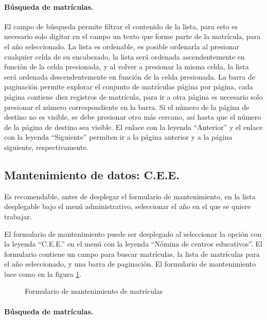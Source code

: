 \documentclass[a4paper, 9pt, conference]{article}              %
\begin{document}
\paragraph{B\'usqueda de matr\'iculas.}

El campo de b\'usqueda permite filtrar el contenido de la lista, para esto es necesario solo digitar en el campo un texto que forme parte de la matr\'icula, para el a\~no seleccionado. La lista es ordenable, es posible ordenarla al presionar cualquier celda de su encabezado, la lista ser\'a ordenada ascendentemente en funci\'on de la celda presionada, y al volver a presionar la misma celda, la lista ser\'a ordenada descendentemente en funci\'on de la celda presionada. La barra de paginaci\'on permite explorar el conjunto de matr\'iculas p\'agina por p\'agina, cada p\'agina contiene diez registros de matr\'icula, para ir a otra p\'agina es necesario solo presionar el n\'umero correspondiente en la barra. Si el n\'umero de la p\'agina de destino no es visible, se debe presionar otro m\'as cercano, as\'i hasta que el n\'umero de la p\'agina de destino sea visible. El enlace con la leyenda ``Anterior'' y el enlace con la leyenda ``Siguiente'' permiten ir a la p\'agina anterior y a la p\'agina siguiente, respectivamente.


\subsection{Mantenimiento de datos: C.E.E.}
Es recomendable, antes de desplegar el formulario de mantenimiento, en la lista desplegable bajo el men\'u administrativo, seleccionar el a\~no en el que se quiere trabajar.

El formulario de mantenimiento puede ser desplegado al seleccionar la opci\'on con la leyenda ``C.E.E.'' en el men\'u con la leyenda ``N\'omina de centros educativos''. El formulario contiene un campo para buscar matr\'iculas, la lista de matr\'iculas para el a\~no seleccionado, y una barra de paginaci\'on. El formulario de mantenimiento luce como en la figura \ref{fig:geoenrollments5}.

\begin{figure}
	\centering
		\caption{Formulario de mantenimiento de matr\'iculas}
	\label{fig:geoenrollments5}
\end{figure}


\paragraph{B\'usqueda de matr\'iculas.}
\end{document}
